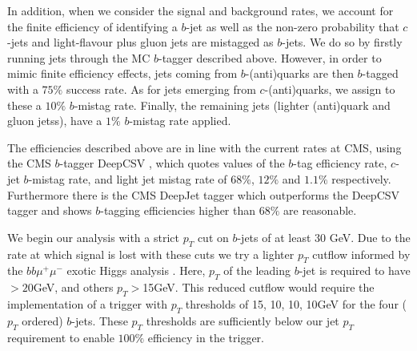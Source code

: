 \documentclass[12pt]{article}
\begin{document}
In addition, when we consider the signal and background rates, we account for the finite efficiency of identifying a $b$-jet as well as the non-zero probability that $c$-jets and light-flavour plus gluon jets are mistagged as $b$-jets. We do so by firstly running jets through the MC $b$-tagger described above. However, in order to mimic finite efficiency effects, jets coming from $b$-(anti)quarks are then $b$-tagged with a $75\%$ success rate.
As for jets emerging from $c$-(anti)quarks, we assign to these a $10\%$ $b$-mistag rate. Finally, the remaining jets (lighter (anti)quark and gluon jetss), have a $1\%$ $b$-mistag rate applied.

The efficiencies described above are in line with the current rates at CMS, using the CMS $b$-tagger DeepCSV \cite{Sirunyan:2017ezt}, which quotes values of the $b$-tag efficiency rate, $c$-jet $b$-mistag rate, and light jet mistag rate of $68\%$, $12\%$ and $1.1\%$ respectively. Furthermore there is the CMS DeepJet tagger \cite{DEEPJET} which outperforms the DeepCSV tagger and shows $b$-tagging efficiencies higher than $68\%$ are reasonable.

We begin our analysis with a strict $p_T$ cut on $b$-jets of at least 30 GeV. Due to the rate at which signal is lost with these cuts we try a lighter $p_T$ cutflow informed by the $bb\mu^+\mu^-$ exotic Higgs analysis \cite{Sirunyan:2018mot}. Here, $p_T$ of the leading $b$-jet is required to have $>20$GeV, and others $p_T  >$15GeV. This reduced cutflow would require the implementation of a trigger with $p_T$ thresholds of 15, 10, 10, 10GeV for the four ($p_T$ ordered) $b$-jets. These $p_T$ thresholds are sufficiently below our jet $p_T$ requirement to enable $100\%$ efficiency in the trigger. 
\end{document}
